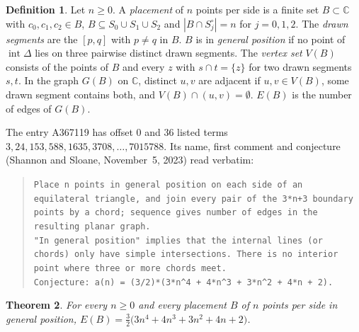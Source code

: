 \documentclass[11pt]{amsart}
\theoremstyle{plain}
\newtheorem{theorem}{Theorem}
\theoremstyle{definition}
\newtheorem{definition}[theorem]{Definition}
\newcommand{\C}{\mathbb{C}}
\newcommand{\inter}{\operatorname{int}}
\begin{document}
\begin{definition}\label{def:graph}
Let $n\ge0$. A \emph{placement} of $n$ points per side is a finite set $B\subset\C$ with $c_0,c_1,c_2\in B$, $B\subseteq S_0\cup S_1\cup S_2$ and $|B\cap S_j^\circ|=n$ for $j=0,1,2$. The \emph{drawn segments} are the $[p,q]$ with $p\ne q$ in $B$. $B$ is in \emph{general position} if no point of $\inter\Delta$ lies on three pairwise distinct drawn segments. The \emph{vertex set} $V(B)$ consists of the points of $B$ and every $z$ with $s\cap t=\{z\}$ for two drawn segments $s,t$. In the graph $G(B)$ on $\C$, distinct $u,v$ are adjacent if $u,v\in V(B)$, some drawn segment contains both, and $V(B)\cap(u,v)=\emptyset$. $E(B)$ is the number of edges of $G(B)$.
\end{definition}

The entry A367119 \cite{A367119} has offset $0$ and $36$ listed terms $3, 24, 153, 588, 1635, 3708,\dots,7015788$. Its name, first comment and conjecture (Shannon and Sloane, November~5, 2023) read verbatim:
\begin{quote}\scriptsize\raggedright
\texttt{Place n points in general position on each side of an equilateral triangle, and join every pair of the 3*n+3 boundary points by a chord; sequence gives number of edges in the resulting planar graph.}\\
\texttt{"In general position" implies that the internal lines (or chords) only have simple intersections. There is no interior point where three or more chords meet.}\\
\texttt{Conjecture: a(n) = (3/2)*(3*n\^{}4 + 4*n\^{}3 + 3*n\^{}2 + 4*n + 2).}
\end{quote}

\begin{theorem}\label{thm:main}
For every $n\ge0$ and every placement $B$ of $n$ points per side in general position, $E(B)=\frac32\bigl(3n^4+4n^3+3n^2+4n+2\bigr)$.
\end{theorem}
\end{document}
